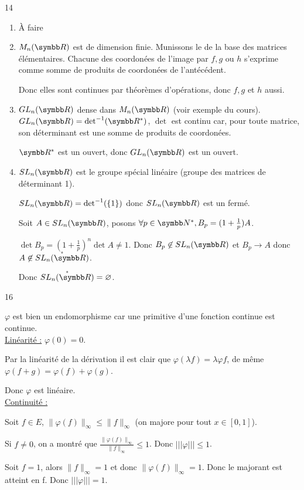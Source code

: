 \begin{correction}{14}
\begin{enumerate}
    \item À faire
    \item $M_n(\R)$ est de dimension finie. Munissons le de la base des matrices élémentaires. 
        Chacune des coordonées de l'image par $f,g$ ou $h$ s'exprime comme somme de produits de coordonées de l'antécédent.

        Donc elles sont continues par théorèmes d'opérations, donc $f,g$ et $h$ aussi.

    \item $GL_n(\R)$ dense dans $M_n(\R)$ (voir exemple du cours). $GL_n(\R) = \det^{-1}(\R^{*})$, 
        $\det$ est continu car, pour toute matrice, son déterminant est une somme de produits de coordonées.

        $\R^{*}$ est un ouvert, donc $GL_n(\R)$ est un ouvert.

    \item $SL_n(\R)$ est le groupe spécial linéaire (groupe des matrices de déterminant 1). 

        $SL_n(\R) = \det^{-1} (\{1\})$ donc $SL_n(\R)$ est un fermé.

        Soit $A \in SL_n(\R)$, posons $\forall p \in \N^{*}, B_p = (1 + \frac 1 p) A$.

        $\det B_p = (1 + \frac 1 p)^n \det A \not \equal 1$. Donc $B_p \not \in SL_n(\R)$ et $B_p \to A$ donc $A \not \in \mathring{SL_n(\R)}$.

        Donc $\mathring{SL_n(\R)} = \varnothing$.
\end{enumerate}
\end{correction}

\begin{correction}{16}

    $\varphi$ est bien un endomorphisme car une primitive d'une fonction continue est continue. \\

    \uline{Linéarité :}
    $\varphi{(0)} = 0$.

    Par la linéarité de la dérivation il est clair que $\varphi (\lambda f) = \lambda \varphi f$, 
    de même $\varphi (f + g) = \varphi{(f)} + \varphi{(g)}$. 

    Donc $\varphi$ est linéaire. \\

    \uline{Continuité :}

    Soit $f \in E$, $\| \varphi{(f)}\|_{\infty} \leqslant \|f\|_{\infty}$ (on majore pour tout $x \in [0,1]$).

    Si $f \not \equal 0$, on a montré que $\frac{\|\varphi{(f)}\|_{\infty}}{\|f\|_{\infty}} \leqslant 1$. Donc $|||\varphi||| \leqslant 1$.

    Soit $f = 1$, alors $\|f\|_{\infty} = 1$ et donc $\|\varphi{(f)}\|_{\infty} = 1$.
    Donc le majorant est atteint en f. Donc $|||\varphi||| = 1$.
\end{correction}

